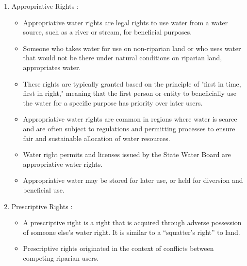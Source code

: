 \begin{itemize}
\begin {enumerate}
\begin{itemize}
\end{itemize}

\item{Appropriative Rights} :\\
\begin{itemize}
\item Appropriative water rights are legal rights to use water from a water source, such as a river or stream, for beneficial purposes.
\item Someone who takes water for use on non-riparian land or who uses water that would not be there under natural conditions on riparian land, appropriates water.
\item These rights are typically granted based on the principle of "first in time, first in right," meaning that the first person or entity to beneficially use the water for a specific purpose has priority over later users. 
\item Appropriative water rights are common in regions where water is scarce and are often subject to regulations and permitting processes to ensure fair and sustainable allocation of water resources.
\item Water right permits and licenses issued by the State Water Board are appropriative water rights.
\item Appropriative water may be stored for later use, or held for diversion and beneficial use.
\end{itemize}

\item Prescriptive Rights :\\
\begin{itemize}
\item A prescriptive right is a right that is acquired through adverse possession of someone else’s water right. It is similar to a “squatter’s right” to land.
\item Prescriptive rights originated in the context of conflicts between competing riparian users.
\end{itemize}

\end{enumerate}
\end{itemize}
